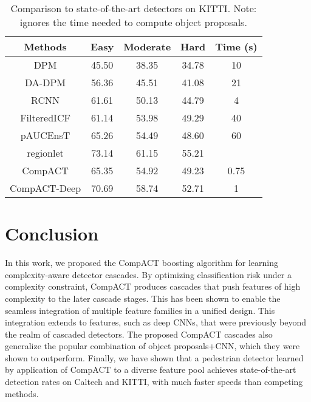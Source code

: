 \documentclass[10pt,twocolumn,letterpaper]{article}
\begin{document}
\begin{table}[t]
\centering \scriptsize \setlength{\tabcolsep}{3.0pt}
\vspace{0.1cm} \caption{Comparison to state-of-the-art detectors on KITTI.
Note:  ignores the time needed to compute object proposals.}
\label{tab:kitti AUC and Time}
\begin{tabular}
{|c||ccc||c|}\hline\multicolumn{1}{|c||}{Methods}
&\multicolumn{1}{c}{Easy}
&\multicolumn{1}{c}{Moderate}
&\multicolumn{1}{c||}{Hard}
&\multicolumn{1}{c|}{Time (s)}\\\hline
DPM             &45.50  &38.35  &34.78  &10 \\
DA-DPM          &56.36  &45.51  &41.08  &21 \\
RCNN            &61.61  &50.13  &44.79  &4 \\
FilteredICF     &61.14  &53.98  &49.29  &40 \\
pAUCEnsT        &65.26  &54.49  &48.60  &60 \\
regionlet       &73.14  &61.15  &55.21  & \\
CompACT         &65.35  &54.92  &49.23  &0.75 \\
CompACT-Deep    &70.69  &58.74  &52.71  &1 \\\hline
\end{tabular}
\end{table}

\section{Conclusion}

In this work, we proposed the CompACT boosting algorithm for learning
complexity-aware detector cascades. By optimizing classification risk under
a complexity constraint, CompACT produces cascades that push features of
high complexity to the later cascade stages. This has been shown to enable
the seamless integration of multiple feature families in a unified design. This integration extends to
features, such as deep CNNs, that were previously
beyond the realm of cascaded detectors. The proposed CompACT cascades
also generalize the popular combination of object
proposals+CNN, which they were shown to outperform. Finally, we have
shown that a pedestrian detector learned by application of CompACT to a
diverse feature pool achieves state-of-the-art detection rates on
Caltech and KITTI, with much faster speeds than competing methods.




{\small


}
\end{document}

